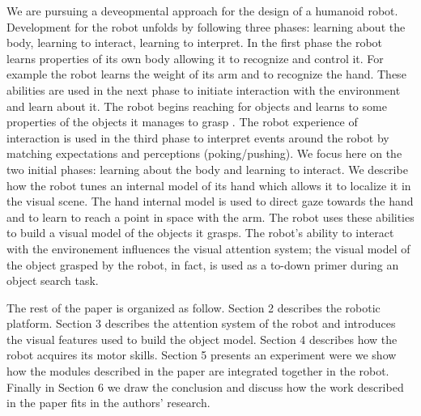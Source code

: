 We are pursuing a deveopmental approach for the design of a humanoid robot. Development for the robot unfolds by following three phases: learning about the body, learning to interact, learning to interpret. In the first phase the robot learns properties of its own body allowing it to recognize and control it. For example the robot learns the weight of its arm and to recognize the hand. These abilities are used in the next phase to initiate interaction with the environment and learn about it. The robot begins reaching for objects and learns to some properties of the objects it manages to grasp \cite{natale04learning,natale05exploring,torres-jara05tapping}. The robot experience of interaction is used in the third phase to interpret events around the robot by matching expectations and perceptions (poking/pushing). We focus here on the two initial phases: learning about the body and learning to interact. We describe how the robot tunes an internal model of its hand which allows it to localize it in the visual scene. The hand internal model is used to direct gaze towards the hand and to learn to reach a point in space with the arm. The robot uses these abilities to build a visual model of the objects it grasps. The robot's ability to interact with the environement influences the visual attention system; the visual model of the object grasped by the robot, in fact, is used as a to-down primer during an object search task.

The rest of the paper is organized as follow. Section 2 describes the robotic platform. Section 3 describes the attention system of the robot and introduces the visual features used to build the object model. Section 4 describes how the robot acquires its motor skills. Section 5 presents an experiment were we show how the modules described in the paper are integrated together in the robot. Finally in Section 6 we draw the conclusion and discuss how the work described in the paper fits in the authors' research.

